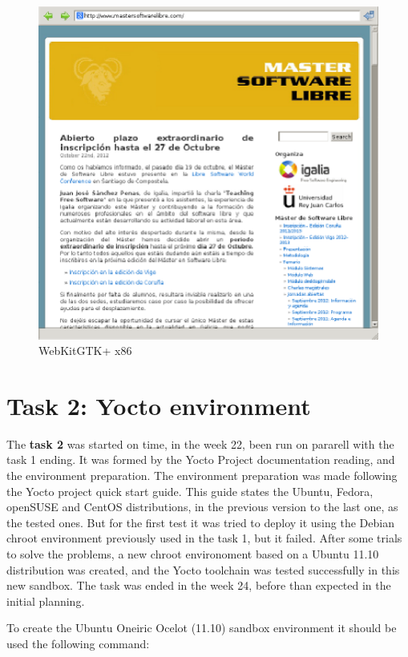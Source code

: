 \documentclass[a4paper,11pt,openany]{report}
\begin{document}
\begin{figure}[hbtp]
\centering
\includegraphics[scale=1]{webkit_x86.eps}
\caption{WebKitGTK+ x86}
\end{figure}

\section{Task 2: Yocto environment}
The \textbf{task 2} was started on time, in the week 22, been run on pararell with the task 1 ending. It was formed by the Yocto Project documentation reading, and the environment preparation.
The environment preparation was made following the Yocto project quick start guide\cite{yocto quick start}. This guide states the Ubuntu, Fedora, openSUSE and CentOS distributions, in the previous version to the last one, as the tested ones. But for the first test it was tried to deploy it using the Debian chroot environment previously used in the task 1, but it failed. After some trials to solve the problems, a new chroot environoment based on a Ubuntu 11.10 distribution was created, and the Yocto toolchain was tested successfully in this new sandbox. The task was ended in the week 24, before than expected in the initial planning.

To create the Ubuntu Oneiric Ocelot (11.10) sandbox environment it should be used the following command:
\end{document}
